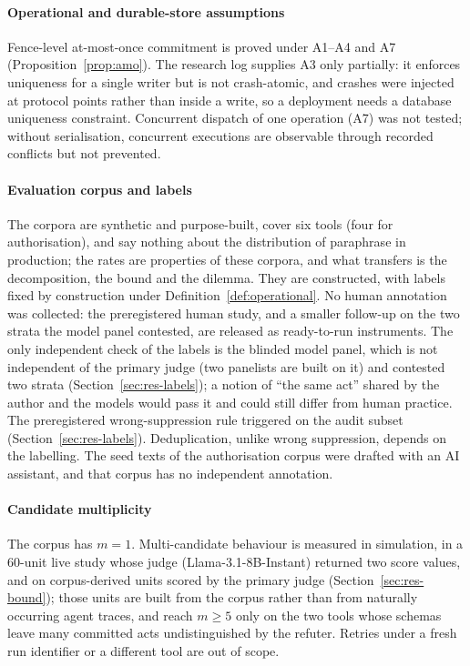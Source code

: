 \paragraph{Operational and durable-store assumptions}
Fence-level at-most-once commitment is proved under A1--A4 and A7 (Proposition~\ref{prop:amo}). The research log supplies A3 only partially: it enforces uniqueness for a single writer but is not crash-atomic, and crashes were injected at protocol points rather than inside a write, so a deployment needs a database uniqueness constraint. Concurrent dispatch of one operation (A7) was not tested; without serialisation, concurrent executions are observable through recorded conflicts but not prevented.

\paragraph{Evaluation corpus and labels} The corpora are synthetic and purpose-built, cover six tools (four for authorisation), and say nothing about the distribution of paraphrase in production; the rates are properties of these corpora, and what transfers is the decomposition, the bound and the dilemma. They are constructed, with labels fixed by construction under Definition~\ref{def:operational}. No human annotation was collected: the preregistered human study, and a smaller follow-up on the two strata the model panel contested, are released as ready-to-run instruments. The only independent check of the labels is the blinded model panel, which is not independent of the primary judge (two panelists are built on it) and contested two strata (Section~\ref{sec:res-labels}); a notion of ``the same act'' shared by the author and the models would pass it and could still differ from human practice. The preregistered wrong-suppression rule triggered on the audit subset (Section~\ref{sec:res-labels}). Deduplication, unlike wrong suppression, depends on the labelling. The seed texts of the authorisation corpus were drafted with an AI assistant, and that corpus has no independent annotation.

\paragraph{Candidate multiplicity} The corpus has $m = 1$. Multi-candidate behaviour is measured in simulation, in a 60-unit live study whose judge (Llama-3.1-8B-Instant) returned two score values, and on corpus-derived units scored by the primary judge (Section~\ref{sec:res-bound}); those units are built from the corpus rather than from naturally occurring agent traces, and reach $m\ge5$ only on the two tools whose schemas leave many committed acts undistinguished by the refuter. Retries under a fresh run identifier or a different tool are out of scope.

